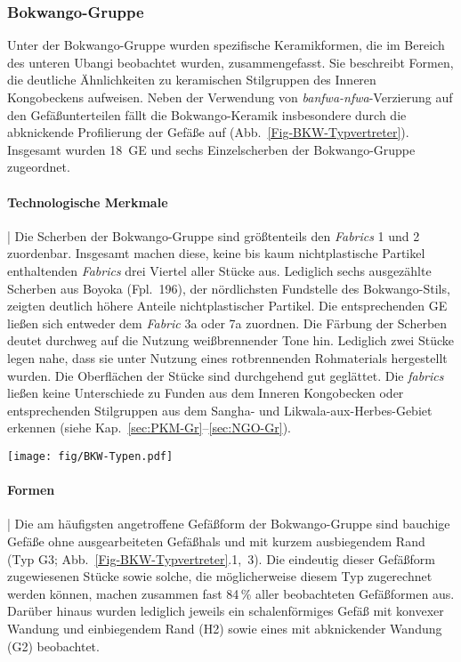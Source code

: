 \subsubsection{Bokwango-Gruppe}\label{sec:BKW-Gr}

Unter der Bokwango-Gruppe wurden spezifische Keramikformen, die im Bereich des unteren \mbox{Ubangi} beobachtet wurden, zusammengefasst. Sie beschreibt Formen, die deutliche Ähnlichkeiten zu keramischen Stilgruppen des Inneren Kongobeckens aufweisen. Neben der Verwendung von \textit{banfwa-nfwa}-Verzierung auf den Gefäßunterteilen fällt die Bokwango-Keramik insbesondere durch die abknickende Profilierung der Gefäße auf (Abb.~\ref{Fig-BKW-Typvertreter}). Insgesamt wurden 18~GE und sechs Einzelscherben der Bokwango-Gruppe zugeordnet. 

\paragraph{Technologische Merkmale}\hspace{-.5em}|\hspace{.5em}%
Die Scherben der Bokwango-Gruppe sind größtenteils den \textit{Fabrics} 1 und 2 zuordenbar. Insgesamt machen diese, keine bis kaum nichtplastische Partikel enthaltenden \textit{Fabrics} drei Viertel aller Stücke aus. Lediglich sechs ausgezählte Scherben aus Boyoka (Fpl.~196), der nördlichsten Fundstelle des Bokwango-Stils, zeigten deutlich höhere Anteile nichtplastischer Partikel. Die entsprechenden GE ließen sich entweder dem \textit{Fabric} 3a oder 7a zuordnen. Die Färbung der Scherben deutet durchweg auf die Nutzung weißbrennender Tone hin. Lediglich zwei Stücke legen nahe, dass sie unter Nutzung eines rotbrennenden Rohmaterials hergestellt wurden. Die Oberflächen der Stücke sind durchgehend gut geglättet. Die \textit{fabrics} ließen keine Unterschiede zu Funden aus dem Inneren Kongobecken oder entsprechenden Stilgruppen aus dem \mbox{Sangha}- und Likwala-aux-Herbes-Gebiet erkennen (siehe Kap.~\ref{sec:PKM-Gr}--\ref{sec:NGO-Gr}).

\begin{figure*}[tb]
\centering
\texttt{[image: fig/BKW-Typen.pdf]}
\caption{Bokwango-Gruppe: Typvertreter.\\1:~Taf.~2.1; 2:~Taf.~5.1; 3:~Taf.~1.1.}\label{Fig-BKW-Typvertreter}
\end{figure*}

\paragraph{Formen}\hspace{-.5em}|\hspace{.5em}%
Die am häufigsten angetroffene Gefäßform der Bokwango-Gruppe sind bauchige Gefäße ohne ausgearbeiteten Gefäßhals und mit kurzem ausbiegendem Rand (Typ G3; Abb.~\ref{Fig-BKW-Typvertreter}.1,~3). Die eindeutig dieser Gefäßform zugewiesenen Stücke sowie solche, die möglicherweise diesem Typ zugerechnet werden können, machen zusammen fast 84\,\% aller beobachteten Gefäßformen aus. Darüber hinaus wurden lediglich jeweils ein schalenförmiges Gefäß mit konvexer Wandung und einbiegendem Rand (H2) sowie eines mit abknickender Wandung (G2) beobachtet.

